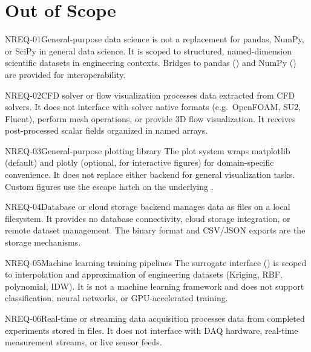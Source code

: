 \section{Out of Scope}

\begin{nreqbox}{NREQ-01}{General-purpose data science}
\itc{} is not a replacement for pandas, NumPy, or SciPy in general data
science. It is scoped to structured, named-dimension scientific datasets in
engineering contexts. Bridges to pandas () and NumPy
() are provided for interoperability.
\end{nreqbox}

\begin{nreqbox}{NREQ-02}{CFD solver or flow visualization}
\itc{} processes data extracted from CFD solvers. It does not interface with
solver native formats (e.g.\ OpenFOAM, SU2, Fluent), perform mesh
operations, or provide 3D flow visualization. It receives post-processed
scalar fields organized in named arrays.
\end{nreqbox}

\begin{nreqbox}{NREQ-03}{General-purpose plotting library}
The \itc{} plot system wraps matplotlib (default) and plotly (optional, for
interactive figures) for domain-specific convenience. It does not replace
either backend for general visualization tasks. Custom figures use the
 escape hatch on the underlying .
\end{nreqbox}

\begin{nreqbox}{NREQ-04}{Database or cloud storage backend}
\itc{} manages data as files on a local filesystem. It provides no database
connectivity, cloud storage integration, or remote dataset management.
The  binary format and CSV/JSON exports are the storage
mechanisms.
\end{nreqbox}

\begin{nreqbox}{NREQ-05}{Machine learning training pipelines}
The surrogate interface () is scoped to interpolation
and approximation of engineering datasets (Kriging, RBF, polynomial, IDW).
It is not a machine learning framework and does not support classification,
neural networks, or GPU-accelerated training.
\end{nreqbox}

\begin{nreqbox}{NREQ-06}{Real-time or streaming data acquisition}
\itc{} processes data from completed experiments stored in files. It does
not interface with DAQ hardware, real-time measurement streams, or live
sensor feeds.
\end{nreqbox}

